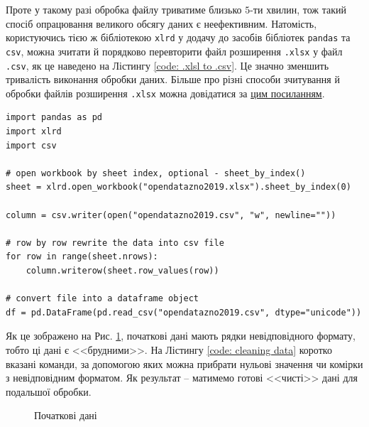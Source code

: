 \vspace{0.4cm}
Проте у такому разі обробка файлу триватиме близько $5$-ти хвилин, тож такий спосіб опрацювання великого 
обсягу даних є неефективним. Натомість, користуючись тією ж бібліотекою \texttt{xlrd} у додачу до засобів 
бібліотек \texttt{pandas} та \texttt{csv}, можна зчитати й порядково перевторити файл розширення \texttt{.xlsx} 
у файл \texttt{.csv}, як це наведено на Лістингу \ref{code: .xlsl to .csv}. Це значно зменшить тривалість 
виконання обробки даних. Більше про різні способи зчитування й обробки файлів розширення \texttt{.xlsx} можна 
довідатися за \href{https://linuxhint.com/read-excel-file-python/}{цим посиланням}.

\newpage
\begin{lstlisting}[firstnumber=16, label = code: .xlsl to .csv, caption = Конвертація у \texttt{.csv} файл]
import pandas as pd
import xlrd 
import csv
    
# open workbook by sheet index, optional - sheet_by_index()
sheet = xlrd.open_workbook("opendatazno2019.xlsx").sheet_by_index(0)
    
column = csv.writer(open("opendatazno2019.csv", "w", newline=""))
    
# row by row rewrite the data into csv file
for row in range(sheet.nrows):
    column.writerow(sheet.row_values(row))
    
# convert file into a dataframe object
df = pd.DataFrame(pd.read_csv("opendatazno2019.csv", dtype="unicode"))
\end{lstlisting}

\vspace{0.4cm}
Як це зображено на Рис. \ref{figure: initial data}, початкові дані мають рядки невідповідного формату, 
тобто ці дані є <<брудними>>. На Лістингу \ref{code: cleaning data} коротко вказані команди, за допомогою 
яких можна прибрати нульові значення чи комірки з невідповідним форматом. Як результат -- матимемо готові 
<<чисті>> дані для подальшої обробки. 

\begin{figure}[H]
    \caption{Початкові дані}
    \label{figure: initial data}
\end{figure}

